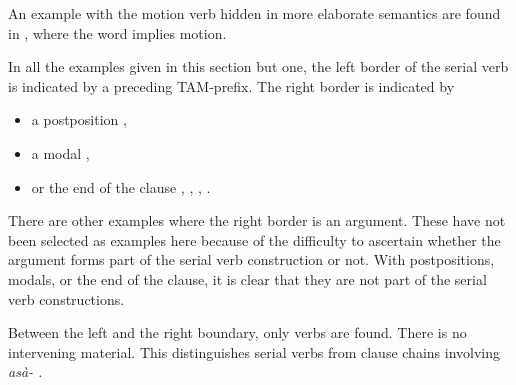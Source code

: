 An example with the motion verb hidden in more elaborate semantics are found in , where the word  implies motion.




In all the examples given in this section but one, the left border of the serial verb is indicated by a preceding TAM-prefix.
The right border is indicated by
\begin{itemize}
 \item a postposition ,
 \item a modal ,
 \item or the end of the clause , , , .
\end{itemize}

There are other examples where the right border is an argument. These have not been selected as examples here because of the difficulty to ascertain whether the argument forms part of the serial verb construction or not. With postpositions, modals, or the end of the clause, it is clear that they are  not part of the serial verb constructions.  

Between the left and the right boundary, only verbs are found. There is  no intervening material. This distinguishes  serial verbs from clause chains involving \em asà- \em {}.


